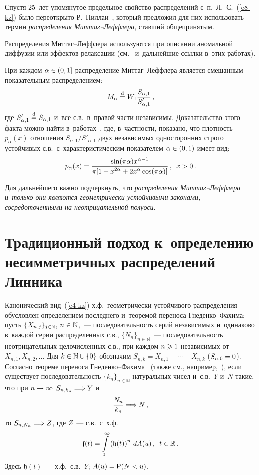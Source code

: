 \begin{multicols}{2}
Спустя 25~лет упомянутое предельное свойство
распределений с~п.~Л.--С.~(\ref{e8-kz}) было переоткрыто 
Р.~Пиллаи~\cite{Pillai1989, Pillai1990}, который предложил для них
использовать термин \textit{распределения Мит\-таг--Леф\-фле\-ра}, ставший
общепринятым.

Распределения Мит\-таг--Леф\-фле\-ра используются при описании аномальной
диффузии или эффектов релаксации (см.~\cite{WeronKotulski1996,
GorenfloMainardi2006} и~дальнейшие ссылки в~этих работах).

При каждом $\alpha\hm\in(0,1]$ распределение Мит\-таг--Леф\-фле\-ра является
смешанным показательным распределением:
$$
M_{\alpha}\stackrel{\mathrm{d}}{=} W_1 \displaystyle\frac{\displaystyle S_{\alpha,1}\mathstrut}{\displaystyle S'_{\alpha,1}\mathstrut}\,,
$$
где $S'_{\alpha,1}\stackrel{\mathrm{d}}{=} S_{\alpha,1}$ и~все с.в.\ в~правой части
независимы. Доказательство этого факта можно найти 
в~работах~\cite{KorolevZeifman2016a, KorolevZeifman2016b, KotzOstrovskii1996},
где, в~част\-ности, показано, что плотность $p_{\alpha}(x)$ отношения
$S_{\alpha,1}/S'_{\alpha,1}$ двух независимых односторонних строго
устойчивых с.в.\ с~характеристическим показателем $\alpha\hm\in(0,1)$
имеет вид:
\begin{equation}
p_{\alpha}(x)=\displaystyle\frac{\displaystyle \sin(\pi\alpha)x^{\alpha-1}\mathstrut}{\displaystyle \pi[1+x^{2\alpha}+2x^{\alpha}\cos(\pi\alpha)]\mathstrut}\,,\enskip
x>0\,.\label{e11-kz}
\end{equation}

Для дальнейшего важно подчеркнуть, что \textit{распределения
Мит\-таг--Леф\-фле\-ра и~только они являются геометрически устойчивыми
законами, сосредоточенными на неотрицательной полуоси}.

\section{Традиционный подход к~определению несимметричных
распределений Линника}

Канонический вид~(\ref{e4-kz}) х.ф.\ геометрически устойчивого распределения
обусловлен определением последнего и~теоремой переноса
Гне\-ден\-ко--Фа\-хи\-ма: пусть $\{X_{n,j}\}_{j\hm\in\mathbb{N}}$,
$n\hm\in\mathbb{N}$,~--- последовательность серий независимых 
и~одинаково в~каждой серии распределенных с.в.,
$\{N_n\}_{n\in\mathbb{N}}$~--- последовательность неотрицательных
целочисленных с.в., при каждом $n\hm\geqslant1$ независимых от
$X_{n,1},X_{n,2},\ldots$ Для $k\hm\in\mathbb{N}\cup\{0\}$ обозначим
$S_{n,k}=X_{n,1}+\cdots+X_{n,k}$ ($S_{n,0}\hm=0$). Согласно теореме
переноса Гне\-ден\-ко--Фа\-хи\-ма~\cite{GnedenkoFahim1969} (также см.,
например,~\cite{GnedenkoKorolev1996}), если существует
последовательность $\{k_n\}_{n\in\mathbb{N}}$ натуральных чисел и~с.в.~$Y$ 
и~$N$ такие, что при $n\hm\to\infty$ $S_{n,k_n}\hm \Longrightarrow Y$ и
\begin{equation}
\displaystyle\frac{\displaystyle N_n\mathstrut}{\displaystyle k_n\mathstrut}\Longrightarrow N\,,\label{e12-kz}
\end{equation}
то $ S_{n,N_n}\hm\Longrightarrow Z$, где $Z$~--- с.в.\ с~х.ф.
$$
\mathfrak{f}(t)=\int\limits_{0}^{\infty}\left(\mathfrak{h}(t)\right)^u\,dA(u)\,,\enskip
t\in\mathbb{R}\,.
$$
Здесь $\mathfrak{h}(t)$~--- х.ф.\ с.в.~$Y$; $A(u)\hm={\sf P}(N<u)$.


\end{multicols}
